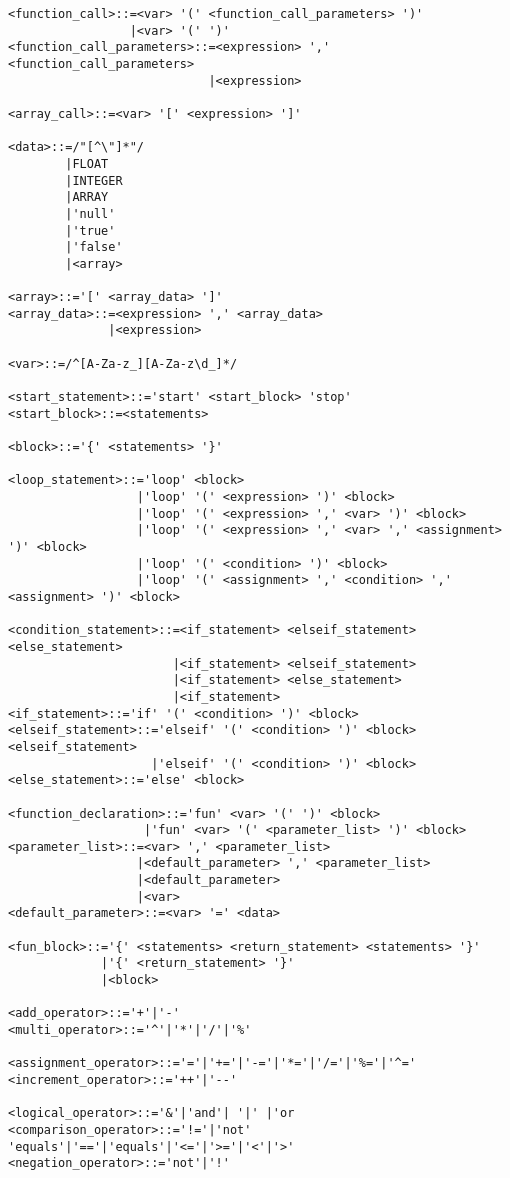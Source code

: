 \documentclass{TDP003mall}
\begin{document}
\begin{lstlisting}
<function_call>::=<var> '(' <function_call_parameters> ')'
                 |<var> '(' ')'
<function_call_parameters>::=<expression> ',' <function_call_parameters>
                            |<expression>

<array_call>::=<var> '[' <expression> ']'

<data>::=/"[^\"]*"/
        |FLOAT
        |INTEGER
        |ARRAY
        |'null'
        |'true'
        |'false'
        |<array>

<array>::='[' <array_data> ']'
<array_data>::=<expression> ',' <array_data>
              |<expression>

<var>::=/^[A-Za-z_][A-Za-z\d_]*/

<start_statement>::='start' <start_block> 'stop'
<start_block>::=<statements>

<block>::='{' <statements> '}'

<loop_statement>::='loop' <block>
                  |'loop' '(' <expression> ')' <block>
                  |'loop' '(' <expression> ',' <var> ')' <block>
                  |'loop' '(' <expression> ',' <var> ',' <assignment> ')' <block>
                  |'loop' '(' <condition> ')' <block>
                  |'loop' '(' <assignment> ',' <condition> ',' <assignment> ')' <block>        

<condition_statement>::=<if_statement> <elseif_statement> <else_statement>
                       |<if_statement> <elseif_statement>
                       |<if_statement> <else_statement>
                       |<if_statement>
<if_statement>::='if' '(' <condition> ')' <block>
<elseif_statement>::='elseif' '(' <condition> ')' <block> <elseif_statement>
                    |'elseif' '(' <condition> ')' <block>
<else_statement>::='else' <block>

<function_declaration>::='fun' <var> '(' ')' <block>
                   |'fun' <var> '(' <parameter_list> ')' <block>
<parameter_list>::=<var> ',' <parameter_list>
                  |<default_parameter> ',' <parameter_list>
                  |<default_parameter>
                  |<var>
<default_parameter>::=<var> '=' <data>

<fun_block>::='{' <statements> <return_statement> <statements> '}'
             |'{' <return_statement> '}'
             |<block>

<add_operator>::='+'|'-'
<multi_operator>::='^'|'*'|'/'|'%'

<assignment_operator>::='='|'+='|'-='|'*='|'/='|'%='|'^='
<increment_operator>::='++'|'--'

<logical_operator>::='&'|'and'| '|' |'or
<comparison_operator>::='!='|'not' 'equals'|'=='|'equals'|'<='|'>='|'<'|'>'
<negation_operator>::='not'|'!'
\end{lstlisting}
\end{document}
